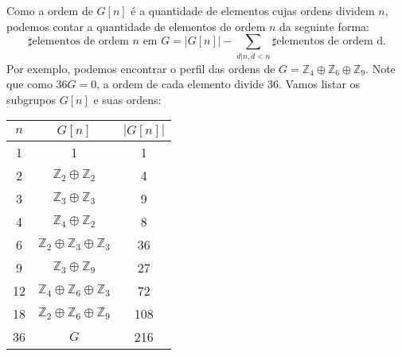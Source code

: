     	\par\vspace{0.3cm} Como a ordem de $G[n]$ é a quantidade de elementos cujas ordens dividem $n$, 
    	podemos contar a quantidade de elementos de ordem $n$ da seguinte forma:
    	\begin{equation*}
    	    \sharp\text{elementos de ordem $n$ em $G$} 
    	    = |G[n]| - \sum_{d|n, d<n}\sharp\text{elementos de ordem d}.
    	\end{equation*}
    	Por exemplo, podemos encontrar o perfil das ordens de 
    	$G = \mathbb{Z}_4\oplus\mathbb{Z}_6\oplus\mathbb{Z}_9$. Note que como $36G = 0$, a ordem de cada 
    	elemento divide $36$. Vamos listar os subgrupos $G[n]$ e suas ordens:
    	\begin{center}
    	    \begin{tabular}{c|c|c}
    	       $n$ & $G[n]$ & $|G[n]|$ \\
    	       \hline
    	        1 & 1 & 1 \\
    	        2 & $\mathbb{Z}_2\oplus\mathbb{Z}_2$ & 4 \\
    	        3 & $\mathbb{Z}_3\oplus\mathbb{Z}_3$ & 9 \\
    	        4 & $\mathbb{Z}_4\oplus\mathbb{Z}_2$ & 8 \\
    	        6 & $\mathbb{Z}_2\oplus\mathbb{Z}_3\oplus\mathbb{Z}_3$ & 36 \\
    	        9 & $\mathbb{Z}_3\oplus\mathbb{Z}_9$ & 27 \\
    	        12 & $\mathbb{Z}_4\oplus\mathbb{Z}_6\oplus\mathbb{Z}_3$ & 72 \\
    	        18 & $\mathbb{Z}_2\oplus\mathbb{Z}_6\oplus\mathbb{Z}_9$ & 108 \\
    	        36 & $G$ & 216
    	    \end{tabular}
    	\end{center}
